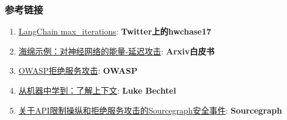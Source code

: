 \documentclass[
]{article}
\providecommand{\tightlist}{%
  \setlength{\itemsep}{0pt}\setlength{\parskip}{0pt}}
\begin{document}
\subsubsection{参考链接}\label{ux53c2ux8003ux94feux63a5}

\begin{enumerate}
\def\labelenumi{\arabic{enumi}.}
\tightlist
\item
  \href{https://twitter.com/hwchase17/status/1608467493877579777}{LangChain
  max\_iterations}: \textbf{Twitter上的hwchase17}
\item
  \href{https://arxiv.org/abs/2006.03463}{海绵示例：对神经网络的能量-延迟攻击}:
  \textbf{Arxiv白皮书}
\item
  \href{https://owasp.org/www-community/attacks/Denial_of_Service}{OWASP拒绝服务攻击}:
  \textbf{OWASP}
\item
  \href{https://lukebechtel.com/blog/lfm-know-thy-context}{从机器中学到：了解上下文}:
  \textbf{Luke Bechtel}
\item
  \href{https://about.sourcegraph.com/blog/security-update-august-2023}{关于API限制操纵和拒绝服务攻击的Sourcegraph安全事件}:
  \textbf{Sourcegraph}
\end{enumerate}
\end{document}

